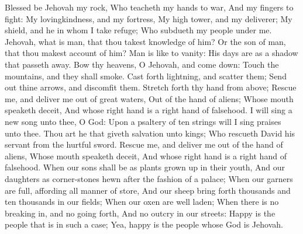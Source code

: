 Blessed be Jehovah my rock, Who teacheth my hands to war, And my fingers to fight:  My lovingkindness, and my fortress, My high tower, and my deliverer; My shield, and he in whom I take refuge; Who subdueth my people under me.  Jehovah, what is man, that thou takest knowledge of him? Or the son of man, that thou makest account of him?  Man is like to vanity: His days are as a shadow that passeth away.  Bow thy heavens, O Jehovah, and come down: Touch the mountains, and they shall smoke.  Cast forth lightning, and scatter them; Send out thine arrows, and discomfit them.  Stretch forth thy hand from above; Rescue me, and deliver me out of great waters, Out of the hand of aliens;  Whose mouth speaketh deceit, And whose right hand is a right hand of falsehood.  I will sing a new song unto thee, O God: Upon a psaltery of ten strings will I sing praises unto thee.  Thou art he that giveth salvation unto kings; Who rescueth David his servant from the hurtful sword.  Rescue me, and deliver me out of the hand of aliens, Whose mouth speaketh deceit, And whose right hand is a right hand of falsehood.  When our sons shall be as plants grown up in their youth, And our daughters as corner-stones hewn after the fashion of a palace;  When our garners are full, affording all manner of store, And our sheep bring forth thousands and ten thousands in our fields;  When our oxen are well laden; When there is no breaking in, and no going forth, And no outcry in our streets:  Happy is the people that is in such a case; Yea, happy is the people whose God is Jehovah. 

